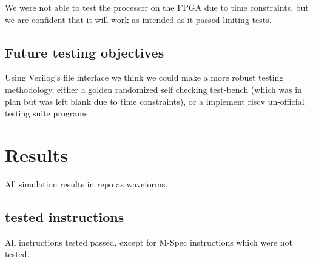 \documentclass{article}
\begin{document}
We were not able to test the processor on the FPGA due to time constraints, but we are confident that it will work as intended as it passed liniting tests.

\subsection{Future testing objectives}

\quad Using Verilog's file interface we think we could make a more robust testing methodology, either a golden randomized self checking test-bench (which was in plan but was left blank due to time constraints), or a implement riscv un-official testing suite programs.

\section{Results}  
All simulation results in repo as waveforms.

\subsection{tested instructions} 
All instructions tested passed, except for M-Spec instructions which were not tested.
\end{document}
